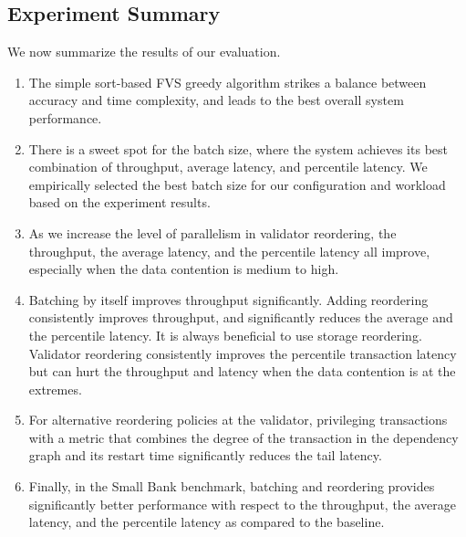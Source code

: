 \subsection{Experiment Summary}

We now summarize the results of our evaluation.

\begin{enumerate}
\item The simple sort-based FVS greedy algorithm strikes a balance between accuracy and time complexity, and leads to the best overall system performance. 
\vspace{-.8em}
\item There is a sweet spot for the batch size, where the system achieves its best combination of throughput, average latency, and percentile latency. We empirically selected the best batch size for our configuration and workload based on the experiment results.
\vspace{-.8em}
\item As we increase the level of parallelism in validator reordering, the throughput, the average latency, and the percentile latency all improve, especially when the data contention is medium to high.
\vspace{-.8em}
\item Batching by itself improves throughput significantly. Adding reordering consistently improves throughput, and significantly reduces the average and the percentile latency. It is always beneficial to use storage reordering. Validator reordering consistently improves the percentile transaction latency but can hurt the throughput and latency when the data contention is at the extremes.
\vspace{-.8em}
\item For alternative reordering policies at the validator, privileging transactions with a metric that combines the degree of the transaction in the dependency graph and its restart time significantly reduces the tail latency.
\vspace{-.8em}
\item Finally, in the Small Bank benchmark, batching and reordering provides significantly better performance with respect to the throughput, the average latency, and the percentile latency as compared to the baseline. 
\vspace{-.8em}
\end{enumerate}  